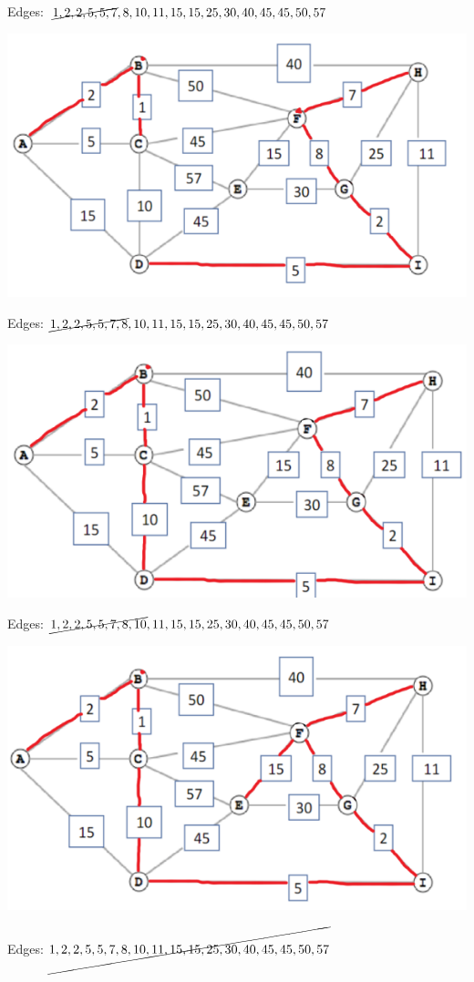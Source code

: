 \documentclass[11pt]{article}
\begin{document}
\begin{itemize}
	Edges: $\cancel{1,2,2,5,5,7},8,10,11,15,15,25,30,40,45,45,50,57$

	\includegraphics[width=\textwidth]{6.png}

	Edges: $\cancel{1,2,2,5,5,7,8},10,11,15,15,25,30,40,45,45,50,57$

	\includegraphics[width=\textwidth]{7.png}

	Edges: $\cancel{1,2,2,5,5,7,8,10},11,15,15,25,30,40,45,45,50,57$

	\includegraphics[width=\textwidth]{8.png}

	Edges: $\cancel{1,2,2,5,5,7,8,10,11,15,15,25,30,40,45,45,50,57}$

\end{itemize}
\end{document}
